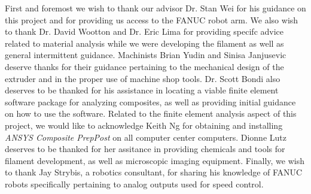 
First and foremost we wish to thank our advisor Dr. Stan Wei for his guidance on this project and for providing us access to the FANUC robot arm. We also wish to thank Dr. David Wootton and Dr. Eric Lima for providing specifc advice related to material analysis while we were developing the filament as well as general intermittent guidance. Machinists Brian Yudin and Sinisa Janjusevic deserve thanks for their guidance pertaining to the mechanical design of the extruder and in the proper use of machine shop tools. Dr. Scott Bondi also deserves to be thanked for his assistance in locating a viable finite element software package for analyzing composites, as well as providing initial guidance on how to use the software. Related to the finite element analysis aspect of this project, we would like to acknowledge Keith Ng for obtaining and installing \emph{ANSYS Composite PrepPost} on all computer center computers. Dionne Lutz deserves to be thanked for her assitance in providing chemicals and tools for filament development, as well as microscopic imaging equipment. Finally, we wish to thank Jay Strybis, a robotics consultant, for sharing his knowledge of FANUC robots specifically pertaining to analog outputs used for speed control.